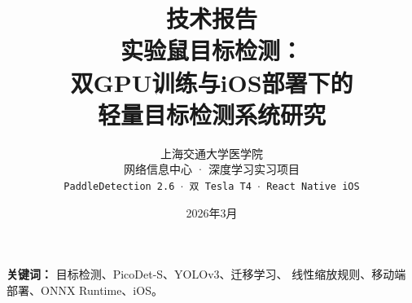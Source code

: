 \documentclass[12pt,a4paper]{ctexart}
\title{
  \vspace{-1cm}
  {\large 技术报告}\\[0.4em]
  \textbf{\LARGE 实验鼠目标检测：\\[0.2em]
  双GPU训练与iOS部署下的\\[0.2em]
  轻量目标检测系统研究}
}
\author{
  上海交通大学医学院\\
  网络信息中心 · 深度学习实习项目\\[0.3em]
  \texttt{PaddleDetection 2.6 $\cdot$ 双 Tesla T4 $\cdot$ React Native iOS}
}
\date{2026年3月}
\begin{document}
\maketitle
\thispagestyle{empty}

\begin{abstract}

\end{abstract}

\vspace{0.5em}
\noindent\textbf{关键词：} 目标检测、PicoDet-S、YOLOv3、迁移学习、
线性缩放规则、移动端部署、ONNX Runtime、iOS。

\newpage
\tableofcontents
\newpage










\newpage


\end{document}
